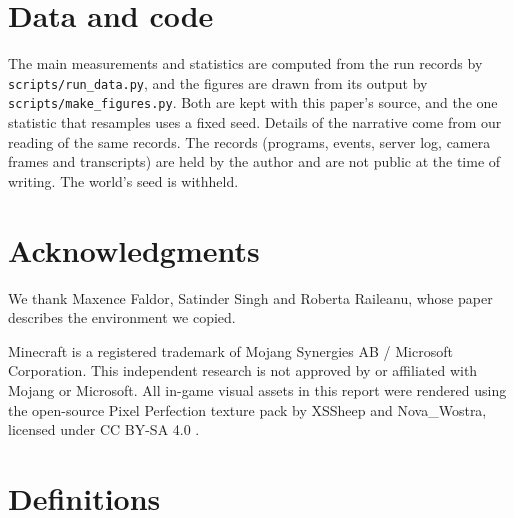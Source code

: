 \documentclass[11pt,a4paper]{article}
\begin{document}
\section*{Data and code}

The main measurements and statistics are computed from the run records by \texttt{scripts/run\_data.py}, and the figures are drawn from its output by \texttt{scripts/make\_figures.py}. Both are kept with this paper's source, and the one statistic that resamples uses a fixed seed. Details of the narrative come from our reading of the same records. The records (programs, events, server log, camera frames and transcripts) are held by the author and are not public at the time of writing. The world's seed is withheld.

\section*{Acknowledgments}

We thank Maxence Faldor, Satinder Singh and Roberta Raileanu, whose paper describes the environment we copied.

Minecraft is a registered trademark of Mojang Synergies AB / Microsoft Corporation. This independent research is not approved by or affiliated with Mojang or Microsoft. All in-game visual assets in this report were rendered using the open-source Pixel Perfection texture pack by XSSheep and Nova\_Wostra, licensed under CC BY-SA 4.0 \citep{pixelperfection}.




\appendix
\section{Definitions}
\label{app:defs}
\end{document}
